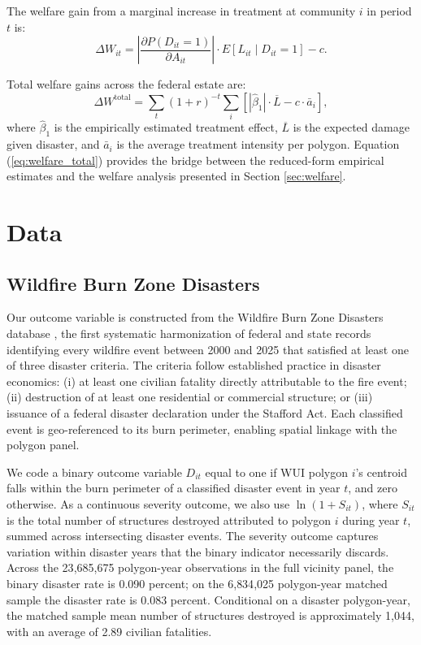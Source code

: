 \documentclass[12pt, letterpaper]{article}
\begin{document}
The welfare gain from a marginal increase in treatment at community $i$ in period $t$ is:
\begin{equation}
\Delta W_{it} = \left|\frac{\partial P(D_{it} = 1)}{\partial A_{it}}\right| \cdot E[L_{it} \mid D_{it} = 1] - c.
\label{eq:welfare_marginal}
\end{equation}

Total welfare gains across the federal estate are:
\begin{equation}
\Delta W^{\text{total}} = \sum_t (1+r)^{-t} \sum_i \left[\left|\hat{\beta}_1\right| \cdot \overline{L} - c \cdot \bar{a}_i\right],
\label{eq:welfare_total}
\end{equation}
where $\hat{\beta}_1$ is the empirically estimated treatment effect, $\overline{L}$ is the expected damage given disaster, and $\bar{a}_i$ is the average treatment intensity per polygon. Equation (\ref{eq:welfare_total}) provides the bridge between the reduced-form empirical estimates and the welfare analysis presented in Section \ref{sec:welfare}.


\section{Data}\label{sec:data}

\subsection{Wildfire Burn Zone Disasters}

Our outcome variable is constructed from the Wildfire Burn Zone Disasters database \citep{wilner2025}, the first systematic harmonization of federal and state records identifying every wildfire event between 2000 and 2025 that satisfied at least one of three disaster criteria. The criteria follow established practice in disaster economics: (i) at least one civilian fatality directly attributable to the fire event; (ii) destruction of at least one residential or commercial structure; or (iii) issuance of a federal disaster declaration under the Stafford Act. Each classified event is geo-referenced to its burn perimeter, enabling spatial linkage with the polygon panel.

We code a binary outcome variable $D_{it}$ equal to one if WUI polygon $i$'s centroid falls within the burn perimeter of a classified disaster event in year $t$, and zero otherwise. As a continuous severity outcome, we also use $\ln(1 + S_{it})$, where $S_{it}$ is the total number of structures destroyed attributed to polygon $i$ during year $t$, summed across intersecting disaster events. The severity outcome captures variation within disaster years that the binary indicator necessarily discards. Across the 23{,}685{,}675 polygon-year observations in the full vicinity panel, the binary disaster rate is 0.090 percent; on the 6{,}834{,}025 polygon-year matched sample the disaster rate is 0.083 percent. Conditional on a disaster polygon-year, the matched sample mean number of structures destroyed is approximately 1{,}044, with an average of 2.89 civilian fatalities.
\end{document}
